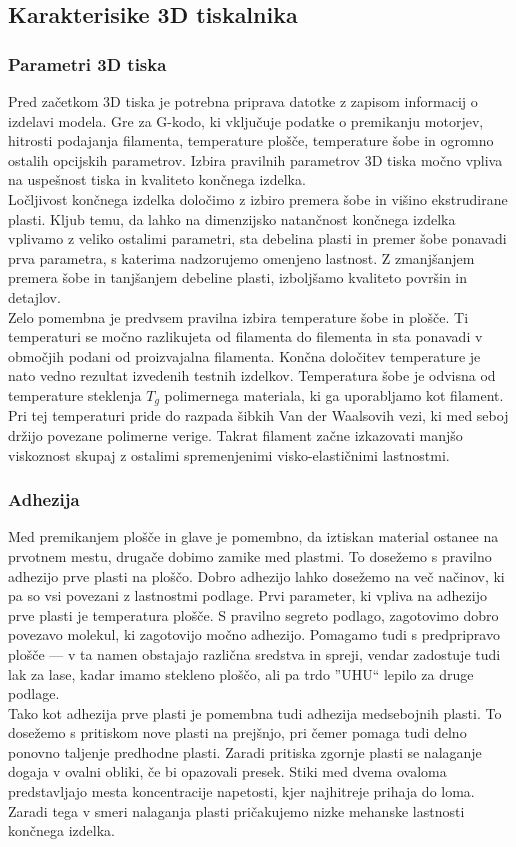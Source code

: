 \documentclass[12pt]{report}
\begin{document}
\subsection{Karakterisike 3D tiskalnika}
\subsubsection{Parametri 3D tiska}
Pred začetkom 3D tiska je potrebna priprava datotke z zapisom informacij o izdelavi modela. Gre za G-kodo, ki vključuje podatke o premikanju motorjev, hitrosti podajanja filamenta, temperature plošče, temperature šobe in ogromno ostalih opcijskih parametrov.
Izbira pravilnih parametrov 3D tiska močno vpliva na uspešnost tiska in kvaliteto končnega izdelka. \\
Ločljivost končnega izdelka določimo z izbiro premera šobe in višino ekstrudirane plasti. Kljub temu, da lahko na dimenzijsko natančnost končnega izdelka vplivamo z veliko ostalimi parametri, sta debelina plasti in premer šobe ponavadi prva parametra, s katerima nadzorujemo
omenjeno lastnost. Z zmanjšanjem premera šobe in tanjšanjem debeline plasti, izboljšamo kvaliteto površin in detajlov. \cite{redwood20173d}
\\
Zelo pomembna je predvsem pravilna izbira temperature šobe in plošče. Ti temperaturi se močno razlikujeta od filamenta do filementa in sta ponavadi v območjih podani od proizvajalna filamenta. Končna določitev temperature je nato vedno rezultat 
izvedenih testnih izdelkov. Temperatura šobe je odvisna od temperature steklenja $T_g$ polimernega materiala, ki ga uporabljamo kot filament. Pri tej temperaturi pride do razpada šibkih Van der Waalsovih vezi, ki med seboj držijo povezane polimerne verige. Takrat filament začne izkazovati
manjšo viskoznost skupaj z ostalimi spremenjenimi visko-elastičnimi lastnostmi.

\subsubsection{Adhezija}
Med premikanjem plošče in glave je pomembno, da iztiskan material ostanee na prvotnem mestu, drugače dobimo zamike med plastmi. To dosežemo s pravilno adhezijo prve plasti na ploščo. Dobro adhezijo lahko dosežemo na več načinov, ki pa so vsi povezani z lastnostmi podlage.
Prvi parameter, ki vpliva na adhezijo prve plasti je temperatura plošče. S pravilno segreto podlago, zagotovimo dobro povezavo molekul, ki zagotovijo močno adhezijo. Pomagamo tudi s predpripravo plošče --- v ta namen obstajajo
različna sredstva in spreji, vendar zadostuje tudi lak za lase, kadar imamo stekleno ploščo, ali pa trdo ''UHU`` lepilo za druge podlage. \\
Tako kot adhezija prve plasti je pomembna tudi adhezija medsebojnih plasti. To dosežemo s pritiskom nove plasti na prejšnjo, pri čemer pomaga tudi delno ponovno taljenje predhodne plasti. Zaradi pritiska zgornje plasti se nalaganje dogaja v ovalni obliki, če bi opazovali presek. Stiki med dvema ovaloma predstavljajo mesta koncentracije napetosti, kjer najhitreje prihaja do loma. \cite{redwood20173d} Zaradi tega v smeri nalaganja plasti pričakujemo 
nizke mehanske lastnosti končnega izdelka.
\end{document}
